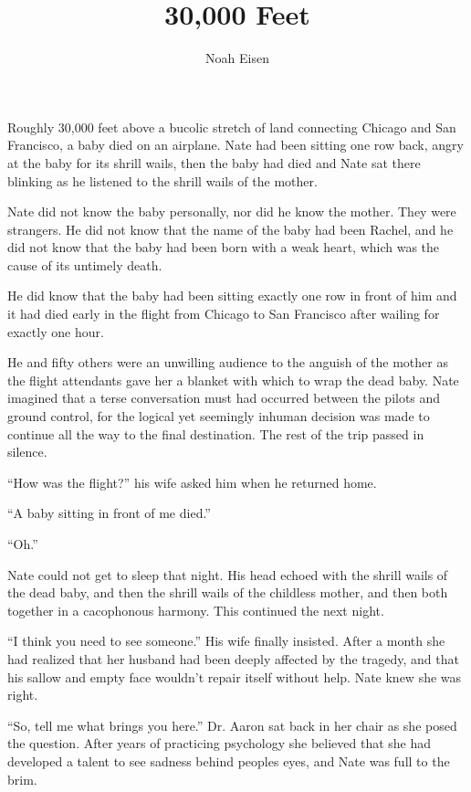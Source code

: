 \documentclass[12pt,oneside,openany]{memoir}
\begin{document}
\title{30,000 Feet}
\author{Noah Eisen}
\date{}
\maketitle
\thispagestyle{empty}
\pagestyle{empty}
\setlength{\parindent}{30pt}

Roughly 30,000 feet above a bucolic stretch of land connecting Chicago and San Francisco, a baby died on an airplane. Nate had been sitting one row back, angry at the baby for its shrill wails, then the baby had died and Nate sat there blinking as he listened to the shrill wails of the mother. 

Nate did not know the baby personally, nor did he know the mother. They were strangers. He did not know that the name of the baby had been Rachel, and he did not know that the baby had been born with a weak heart, which was the cause of its untimely death. 

He did know that the baby had been sitting exactly one row in front of him and it had died early in the flight from Chicago to San Francisco after wailing for exactly one hour. 

He and fifty others were an unwilling audience to the anguish of the mother as the flight attendants gave her a blanket with which to wrap the dead baby. Nate imagined that a terse conversation must had occurred between the pilots and ground control, for the logical yet seemingly inhuman decision was made to continue all the way to the final destination. The rest of the trip passed in silence.

“How was the flight?” his wife asked him when he returned home.

“A baby sitting in front of me died.”

“Oh.”

	Nate could not get to sleep that night. His head echoed with the shrill wails of the dead baby, and then the shrill wails of the childless mother, and then both together in a cacophonous harmony. This continued the next night.
	
	“I think you need to see someone.” His wife finally insisted. After a month she had realized that her husband had been deeply affected by the tragedy, and that his sallow and empty face wouldn't repair itself without help. Nate knew she was right.
	
	“So, tell me what brings you here.” Dr. Aaron sat back in her chair as she posed the question. After years of practicing psychology she believed that she had developed a talent to see sadness behind peoples eyes, and Nate was full to the brim.
	
\end{document}
